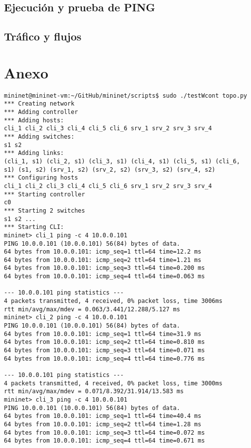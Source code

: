\documentclass{article}
\begin{document}
\subsection{Ejecución y prueba de PING}

\subsection{Tráfico y flujos}

\section{Anexo}
\begin{Verbatim}
mininet@mininet-vm:~/GitHub/mininet/scripts$ sudo ./testWcont topo.py 
*** Creating network
*** Adding controller
*** Adding hosts:
cli_1 cli_2 cli_3 cli_4 cli_5 cli_6 srv_1 srv_2 srv_3 srv_4
*** Adding switches:
s1 s2
*** Adding links:
(cli_1, s1) (cli_2, s1) (cli_3, s1) (cli_4, s1) (cli_5, s1) (cli_6, s1) (s1, s2) (srv_1, s2) (srv_2, s2) (srv_3, s2) (srv_4, s2)
*** Configuring hosts
cli_1 cli_2 cli_3 cli_4 cli_5 cli_6 srv_1 srv_2 srv_3 srv_4
*** Starting controller
c0
*** Starting 2 switches
s1 s2 ...
*** Starting CLI:
mininet> cli_1 ping -c 4 10.0.0.101
PING 10.0.0.101 (10.0.0.101) 56(84) bytes of data.
64 bytes from 10.0.0.101: icmp_seq=1 ttl=64 time=12.2 ms
64 bytes from 10.0.0.101: icmp_seq=2 ttl=64 time=1.21 ms
64 bytes from 10.0.0.101: icmp_seq=3 ttl=64 time=0.200 ms
64 bytes from 10.0.0.101: icmp_seq=4 ttl=64 time=0.063 ms

--- 10.0.0.101 ping statistics ---
4 packets transmitted, 4 received, 0% packet loss, time 3006ms
rtt min/avg/max/mdev = 0.063/3.441/12.288/5.127 ms
mininet> cli_2 ping -c 4 10.0.0.101
PING 10.0.0.101 (10.0.0.101) 56(84) bytes of data.
64 bytes from 10.0.0.101: icmp_seq=1 ttl=64 time=31.9 ms
64 bytes from 10.0.0.101: icmp_seq=2 ttl=64 time=0.810 ms
64 bytes from 10.0.0.101: icmp_seq=3 ttl=64 time=0.071 ms
64 bytes from 10.0.0.101: icmp_seq=4 ttl=64 time=0.776 ms

--- 10.0.0.101 ping statistics ---
4 packets transmitted, 4 received, 0% packet loss, time 3000ms
rtt min/avg/max/mdev = 0.071/8.392/31.914/13.583 ms
mininet> cli_3 ping -c 4 10.0.0.101
PING 10.0.0.101 (10.0.0.101) 56(84) bytes of data.
64 bytes from 10.0.0.101: icmp_seq=1 ttl=64 time=40.4 ms
64 bytes from 10.0.0.101: icmp_seq=2 ttl=64 time=1.28 ms
64 bytes from 10.0.0.101: icmp_seq=3 ttl=64 time=0.072 ms
64 bytes from 10.0.0.101: icmp_seq=4 ttl=64 time=0.671 ms


\end{Verbatim}
\end{document}
